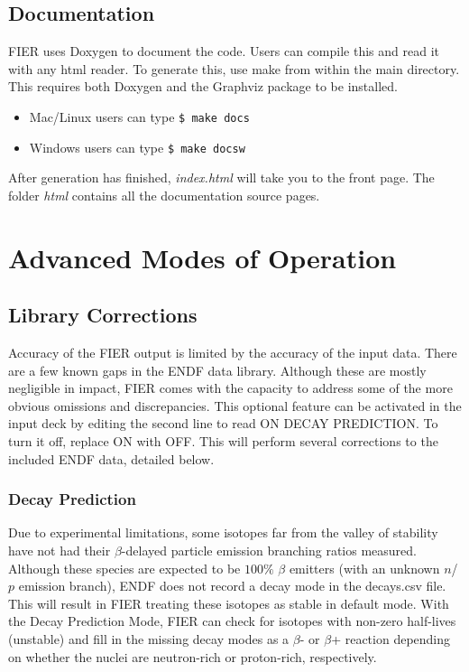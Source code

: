 \documentclass{article}
\begin{document}
\subsection{Documentation}
FIER uses Doxygen to document the code. Users can compile this and read it with any html reader. To generate this, use make from within the main directory. This requires both Doxygen and the Graphviz package to be installed.
\begin{itemize}
    \item Mac/Linux users can type \texttt{\$ make docs}
    \item Windows users can type \texttt{\$ make docsw}
    \end{itemize}
    After generation has finished, \textit{index.html} will take you to the front page. The folder \textit{html} contains all the documentation source pages.


\section{Advanced Modes of Operation}
\subsection{Library Corrections}
\label{libcorrections}
Accuracy of the FIER output is limited by the accuracy of the input data. There are a few known gaps in the ENDF data library. Although these are mostly negligible in impact, FIER comes with the capacity to address some of the more obvious omissions and discrepancies. This optional feature can be activated in the input deck by editing the second line to read ON DECAY PREDICTION. To turn it off, replace ON with OFF. This will perform several corrections to the included ENDF data, detailed below.

\subsubsection{Decay Prediction}
Due to experimental limitations, some isotopes far from the valley of stability have not had their $\beta$-delayed particle emission branching ratios measured. Although these species are expected to be $100\%$ $\beta$ emitters (with an unknown $n$/$p$ emission branch), ENDF does not record a decay mode in the decays.csv file. This will result in FIER treating these isotopes as stable in default mode. With the Decay Prediction Mode, FIER can check for isotopes with non-zero half-lives (unstable) and fill in the missing decay modes as a $\beta$- or $\beta$+ reaction depending on whether the nuclei are neutron-rich or proton-rich, respectively.
\end{document}
